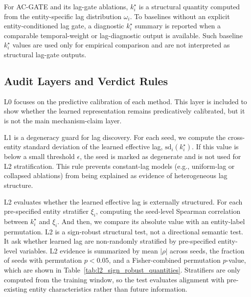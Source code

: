 \documentclass[conference]{IEEEtran}
\begin{document}
For AC-GATE and its lag-gate ablations, $k_i^\star$ is a structural quantity computed from the entity-specific lag distribution $\omega_i$. To baselines without an explicit entity-conditioned lag gate, a diagnostic $k_i^\star$ summary is reported when a comparable temporal-weight or lag-diagnostic output is available. Such baseline $k_i^\star$ values are used only for empirical comparison and are not interpreted as structural lag-gate outputs.

\subsection{Audit Layers and Verdict Rules}
L0 focuses on the predictive calibration of each method. This layer is included to show whether the learned representation remains predicatively calibrated, but it is not the main mechanism-claim layer.

L1 is a degeneracy guard for lag discovery. For each seed, we compute the cross-entity standard deviation of the learned effective lag, $\mathrm{sd}_i(k_i^\star)$. If this value is below a small threshold $\epsilon$, the seed is marked as degenerate and is not used for L2 stratification. This rule prevents constant-lag models (e.g., uniform-lag or collapsed ablations) from being explained as evidence of heterogeneous lag structure.

L2 evaluates whether the learned effective lag is externally structured. For each pre-specified entity stratifier $\xi_i$, computing the seed-level Spearman correlation between $k_i^\star$ and $\xi_i$. And then, we compare its absolute value with an entity-label permutation. L2 is a sign-robust structural test, not a directional semantic test. It ask whether learned lag are non-randomly stratified by pre-specified entity-level variables. L2 evidence is summarized by mean $|\rho|$ across seeds, the fraction of seeds with permutation $p<0.05$, and a Fisher-combined permutation $p$-value, which are shown in Table~\ref{tab:l2_sign_robust_quantities}. Stratifiers are only computed from the training window, so the test evaluates alignment with pre-existing entity characteristics rather than future information.
\end{document}

